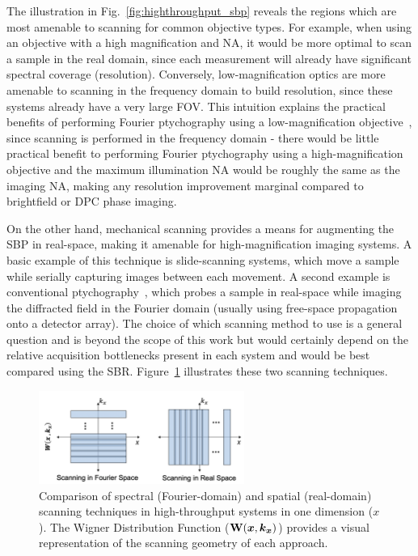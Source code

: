 The illustration in Fig.~\ref{fig:highthroughput_sbp} reveals the regions which are most amenable to scanning for common objective types. For example, when using an objective with a high magnification and NA, it would be more optimal to scan a sample in the real domain, since each measurement will already have significant spectral coverage (resolution). Conversely, low-magnification optics are more amenable to scanning in the frequency domain to build resolution, since these systems already have a very large FOV. This intuition explains the practical benefits of performing Fourier ptychography using a low-magnification objective~\cite{Zheng2013}, since scanning is performed in the frequency domain - there would be little practical benefit to performing Fourier ptychography using a high-magnification objective and the maximum illumination NA would be roughly the same as the imaging NA, making any resolution improvement marginal compared to brightfield or DPC phase imaging.

On the other hand, mechanical scanning provides a means for augmenting the SBP in real-space, making it amenable for high-magnification imaging systems. A basic example of this technique is slide-scanning systems, which move a sample while serially capturing images between each movement. A second example is conventional ptychography~\cite{rodenburg2004phase}, which probes a sample in real-space while imaging the diffracted field in the Fourier domain (usually using free-space propagation onto a detector array). The choice of which scanning method to use is a general question and is beyond the scope of this work but would certainly depend on the relative acquisition bottlenecks present in each system and would be best compared using the SBR. Figure~\ref{fig:highthroughput_scanning} illustrates these two scanning techniques.

\begin{figure}
  \centering
    \includegraphics[width=0.6\textwidth]{figures/fig_highthroughput_scanning.png}
  \caption{\label{fig:highthroughput_scanning} Comparison of spectral (Fourier-domain) and spatial (real-domain) scanning techniques in high-throughput systems in one dimension ($x$). The Wigner Distribution Function ($\mathbf{W}(\bm{x}, \bm{k_x})$) provides a visual representation of the scanning geometry of each approach.}
\end{figure}

